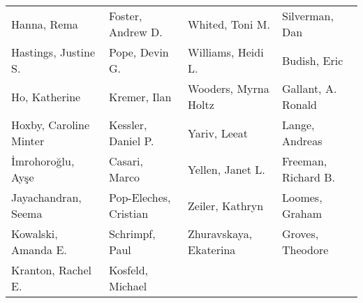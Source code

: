 \begin{ThreePartTable}
{\begin{longtable}[c]{llll}
            Hanna, Rema&Foster, Andrew D.&Whited, Toni M.&Silverman, Dan\\
            Hastings, Justine S.&Pope, Devin G.&Williams, Heidi L.&Budish, Eric\\
            Ho, Katherine&Kremer, Ilan&Wooders, Myrna Holtz&Gallant, A. Ronald\\
            Hoxby, Caroline Minter&Kessler, Daniel P.&Yariv, Leeat&Lange, Andreas\\
            İmrohoroğlu, Ayşe&Casari, Marco&Yellen, Janet L.&Freeman, Richard B.\\
            Jayachandran, Seema&Pop-Eleches, Cristian&Zeiler, Kathryn&Loomes, Graham\\
            Kowalski, Amanda E.&Schrimpf, Paul&Zhuravskaya, Ekaterina&Groves, Theodore\\
            Kranton, Rachel E.&Kosfeld, Michael&&\\
    \end{longtable}}
\end{ThreePartTable}
